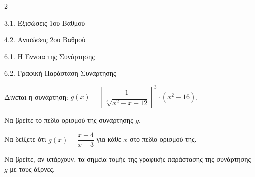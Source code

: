 \begin{ylh}{2}
    \item 3.1. Εξισώσεις 1ου Βαθμού
    \item 4.2. Ανισώσεις 2ου Βαθμού
    \item 6.1. Η Έννοια της Συνάρτησης
    \item 6.2. Γραφική Παράσταση Συνάρτησης
\end{ylh}
Δίνεται η συνάρτηση: $g(x) = \left\lbrack \dfrac{1}{\sqrt[3]{x^{2} - x - 12}} \right\rbrack^{3} \cdot (x^{2} - 16)$.

\begin{alist}
\item Να βρείτε το πεδίο ορισμού της συνάρτησης $g$.
\item Να δείξετε ότι $g(x) = \dfrac{x + 4}{x + 3}$ για κάθε $x$ στο πεδίο ορισμού της.
\item Να βρείτε, αν υπάρχουν, τα σημεία τομής της γραφικής παράστασης της συνάρτησης $g$ με τους άξονες.
\end{alist}

